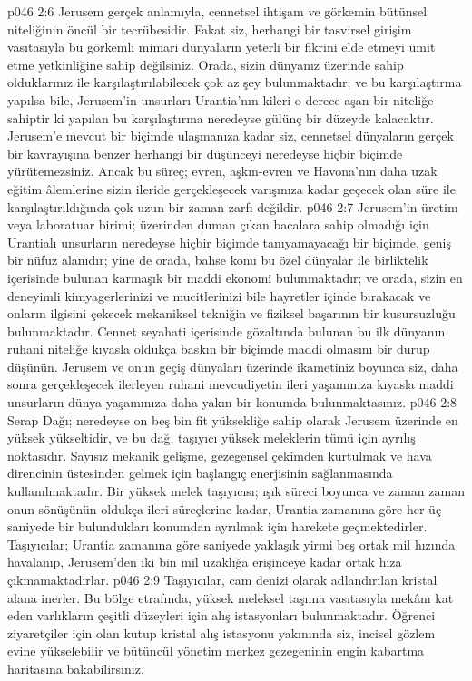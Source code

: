 \vs p046 2:6 Jerusem gerçek anlamıyla, cennetsel ihtişam ve görkemin bütünsel niteliğinin öncül bir tecrübesidir. Fakat siz, herhangi bir tasvirsel girişim vasıtasıyla bu görkemli mimari dünyaların yeterli bir fikrini elde etmeyi ümit etme yetkinliğine sahip değilsiniz. Orada, sizin dünyanız üzerinde sahip olduklarınız ile karşılaştırılabilecek çok az şey bulunmaktadır; ve bu karşılaştırma yapılsa bile, Jerusem’in unsurları Urantia’nın kileri o derece aşan bir niteliğe sahiptir ki yapılan bu karşılaştırma neredeyse gülünç bir düzeyde kalacaktır. Jerusem’e mevcut bir biçimde ulaşmanıza kadar siz, cennetsel dünyaların gerçek bir kavrayışına benzer herhangi bir düşünceyi neredeyse hiçbir biçimde yürütemezsiniz. Ancak bu süreç; evren, aşkın\hyp{}evren ve Havona’nın daha uzak eğitim âlemlerine sizin ileride gerçekleşecek varışınıza kadar geçecek olan süre ile karşılaştırıldığında çok uzun bir zaman zarfı değildir.
\vs p046 2:7 Jerusem’in üretim veya laboratuar birimi; üzerinden duman çıkan bacalara sahip olmadığı için Urantialı unsurların neredeyse hiçbir biçimde tanıyamayacağı bir biçimde, geniş bir nüfuz alanıdır; yine de orada, bahse konu bu özel dünyalar ile birliktelik içerisinde bulunan karmaşık bir maddi ekonomi bulunmaktadır; ve orada, sizin en deneyimli kimyagerlerinizi ve mucitlerinizi bile hayretler içinde bırakacak ve onların ilgisini çekecek mekaniksel tekniğin ve fiziksel başarının bir kusursuzluğu bulunmaktadır. Cennet seyahati içerisinde gözaltında bulunan bu ilk dünyanın ruhani niteliğe kıyasla oldukça baskın bir biçimde maddi olmasını bir durup düşünün. Jerusem ve onun geçiş dünyaları üzerinde ikametiniz boyunca siz, daha sonra gerçekleşecek ilerleyen ruhani mevcudiyetin ileri yaşamınıza kıyasla maddi unsurların dünya yaşamınıza daha yakın bir konumda bulunmaktasınız.
\vs p046 2:8 Serap Dağı; neredeyse on beş bin fit yüksekliğe sahip olarak Jerusem üzerinde en yüksek yükseltidir, ve bu dağ, taşıyıcı yüksek meleklerin tümü için ayrılış noktasıdır. Sayısız mekanik gelişme, gezegensel çekimden kurtulmak ve hava direncinin üstesinden gelmek için başlangıç enerjisinin sağlanmasında kullanılmaktadır. Bir yüksek melek taşıyıcısı; ışık süreci boyunca ve zaman zaman onun sönüşünün oldukça ileri süreçlerine kadar, Urantia zamanına göre her üç saniyede bir bulundukları konumdan ayrılmak için harekete geçmektedirler. Taşıyıcılar; Urantia zamanına göre saniyede yaklaşık yirmi beş ortak mil hızında havalanıp, Jerusem’den iki bin mil uzaklığa erişinceye kadar ortak hıza çıkmamaktadırlar.
\vs p046 2:9 Taşıyıcılar, cam denizi olarak adlandırılan kristal alana inerler. Bu bölge etrafında, yüksek meleksel taşıma vasıtasıyla mekânı kat eden varlıkların çeşitli düzeyleri için alış istasyonları bulunmaktadır. Öğrenci ziyaretçiler için olan kutup kristal alış istasyonu yakınında siz, incisel gözlem evine yükselebilir ve bütüncül yönetim merkez gezegeninin engin kabartma haritasına bakabilirsiniz.
